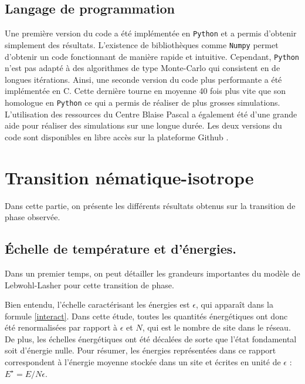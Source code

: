 \documentclass[11pt]{article}
\numberwithin{equation}{section}
\newcommand{\CC}{C\nolinebreak\hspace{-.05em}\raisebox{.4ex}{\tiny\bf +}\nolinebreak\hspace{-.10em}\raisebox{.4ex}{\tiny\bf +}}
\def\CC{{C\nolinebreak[4]\hspace{-.05em}\raisebox{.4ex}{\tiny\bf ++}}}
\begin{document}
\newpage

\subsection{Langage de programmation}
Une première version du code a été implémentée en \texttt{Python} et a permis d'obtenir simplement des résultats. L'existence de bibliothèques comme \texttt{Numpy} permet d'obtenir un code fonctionnant de manière rapide et intuitive. Cependant, \texttt{Python} n'est pas adapté à des algorithmes de type Monte-Carlo qui consistent en de longues itérations. Ainsi, une seconde version du code plus performante a été implémentée en \CC. Cette dernière tourne en moyenne 40 fois plus vite que son homologue en \texttt{Python} ce qui a permis de réaliser de plus grosses simulations. L'utilisation des ressources du Centre Blaise Pascal a également été d'une grande aide pour réaliser des simulations sur une longue durée. Les deux versions du code sont disponibles en libre accès sur la plateforme Github \cite{github}.

\newpage
\section{Transition nématique-isotrope}
Dans cette partie, on présente les différents résultats obtenus sur la transition de phase observée. 
\subsection{Échelle de température et d'énergies.}
\label{scale}
Dans un premier temps, on peut détailler les grandeurs importantes du modèle de Lebwohl-Lasher pour cette transition de phase.
\medskip

Bien entendu, l'échelle caractérisant les énergies est $\epsilon$, qui apparaît dans la formule \ref{interact}. Dans cette étude, toutes les quantités énergétiques ont donc été renormalisées par rapport à $\epsilon$ et $N$, qui est le nombre de site dans le réseau. De plus, les échelles énergétiques ont été décalées de sorte que l'état fondamental soit d'énergie nulle. Pour résumer, les énergies représentées dans ce rapport correspondent à l'énergie moyenne stockée dans un site et écrites en unité de $\epsilon$ : $E^\star=E/N\epsilon$.
\medskip
\end{document}
